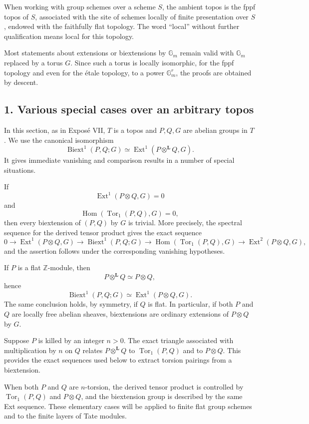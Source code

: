 \documentclass[11pt]{article}
\theoremstyle{plain}
\theoremstyle{definition}
\theoremstyle{remark}
\newcommand{\bZ}{\mathbb Z}
\DeclareMathOperator{\Hom}{Hom}
\DeclareMathOperator{\Ext}{Ext}
\DeclareMathOperator{\Tor}{Tor}
\DeclareMathOperator{\Biext}{Biext}
\newcommand{\Gm}{\mathbb G_m}
\newcommand{\bL}{\mathbf L}
\begin{document}
When working with group schemes over a scheme \(S\), the ambient topos is the
fppf topos of \(S\), associated with the site of schemes locally of finite
presentation over \(S\), endowed with the faithfully flat topology. The word
``local'' without further qualification means local for this topology.

Most statements about extensions or biextensions by \(\Gm\) remain valid with
\(\Gm\) replaced by a torus \(G\). Since such a torus is locally isomorphic, for
the fppf topology and even for the étale topology, to a power \(\Gm^r\), the
proofs are obtained by descent.

\subsection*{1. Various special cases over an arbitrary topos}

In this section, as in Exposé VII, \(T\) is a topos and \(P,Q,G\) are abelian
groups in \(T\). We use the canonical isomorphism
\[
\Biext^1(P,Q;G)\simeq
\Ext^1(P\otimes^{\bL}Q,G).
\]
It gives immediate vanishing and comparison results in a number of special
situations.

If
\[
\Ext^1(P\otimes Q,G)=0
\]
and
\[
\Hom(\Tor_1(P,Q),G)=0,
\]
then every biextension of \((P,Q)\) by \(G\) is trivial. More precisely, the
spectral sequence for the derived tensor product gives the exact sequence
\[
0\to \Ext^1(P\otimes Q,G)\to \Biext^1(P,Q;G)\to
\Hom(\Tor_1(P,Q),G)\to \Ext^2(P\otimes Q,G),
\]
and the assertion follows under the corresponding vanishing hypotheses.

If \(P\) is a flat \(\bZ\)-module, then
\[
P\otimes^{\bL}Q\simeq P\otimes Q,
\]
hence
\[
\Biext^1(P,Q;G)\simeq \Ext^1(P\otimes Q,G).
\]
The same conclusion holds, by symmetry, if \(Q\) is flat. In particular, if both
\(P\) and \(Q\) are locally free abelian sheaves, biextensions are ordinary
extensions of \(P\otimes Q\) by \(G\).

Suppose \(P\) is killed by an integer \(n>0\). The exact triangle associated with
multiplication by \(n\) on \(Q\) relates \(P\otimes^{\bL}Q\) to
\(\Tor_1(P,Q)\) and to \(P\otimes Q\). This provides the exact sequences used
below to extract torsion pairings from a biextension.

When both \(P\) and \(Q\) are \(n\)-torsion, the derived tensor product is
controlled by \(\Tor_1(P,Q)\) and \(P\otimes Q\), and the biextension group is
described by the same Ext sequence. These elementary cases will be applied to
finite flat group schemes and to the finite layers of Tate modules.
\end{document}
